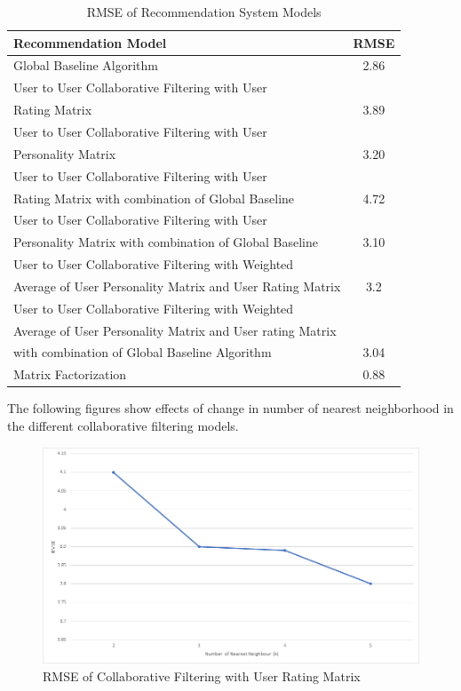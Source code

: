 \begin{center}
  \begin{table}[!h]
    \begin{tabular}{| l | c |}
      \hline
      {\bf Recommendation Model} & {\bf RMSE}\\
      \hline
      Global Baseline Algorithm & 2.86\\
      \hline
      User to User Collaborative Filtering with User & \\ Rating Matrix & 3.89\\
      \hline
      User to User Collaborative Filtering with User & \\ Personality Matrix & 3.20\\
      \hline
      User to User Collaborative Filtering with User & \\ Rating Matrix with combination of Global Baseline & 4.72\\
      \hline
      User to User Collaborative Filtering with User & \\ Personality Matrix with combination of Global Baseline & 3.10\\
      \hline
      User to User Collaborative Filtering with Weighted & \\ Average of User Personality Matrix and User Rating Matrix & 3.2\\
      \hline
      User to User Collaborative Filtering with Weighted & \\ Average of User Personality Matrix and User rating Matrix & \\ with combination of Global Baseline Algorithm & 3.04\\
      \hline
      Matrix Factorization & 0.88\\
      \hline
    \end{tabular}
    \caption{RMSE of Recommendation System Models}
  \end{table}
\end{center}

The following figures show effects of change in number of nearest neighborhood in the different collaborative filtering models.\\

\begin{figure}[!ht]
  \centering
    \includegraphics[width=1\textwidth]{fig/rmse_cf.png}
    \caption{RMSE of Collaborative Filtering with User Rating Matrix}
\end{figure}

